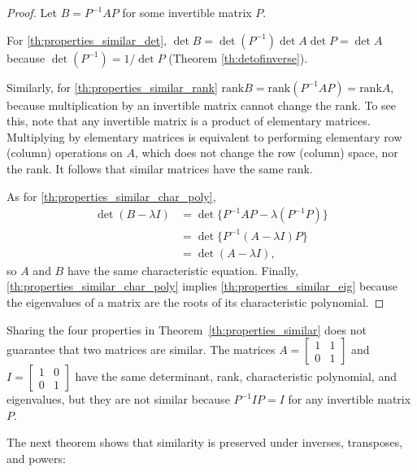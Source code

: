 \documentclass{ximera}
\begin{document}
\begin{proof}
Let $B = P^{-1}AP$ for some invertible matrix $P$. 

For \ref{th:properties_similar_det}, $\det B = \det(P^{-1}) \det A \det P = \det A$ because $\det(P^{-1}) = 1/ \det P$ (Theorem \ref{th:detofinverse}). %

Similarly, for \ref{th:properties_similar_rank} $\mbox{rank} B = \mbox{rank}(P^{-1}AP) = \mbox{rank} A$, because multiplication by an invertible matrix cannot change the rank.  To see this, note that any invertible matrix is a product of elementary matrices.  Multiplying by elementary matrices is equivalent to performing elementary row (column) operations on $A$, which does not change the row (column) space, nor the rank.  It follows that similar matrices have the same rank. 

As for \ref{th:properties_similar_char_poly},
\begin{align*}
\det(B-\lambda I) &= \det \{P^{-1}AP-\lambda(P^{-1}P)\} \\
&= \det \{ P^{-1}(A-\lambda I)P\} \\
&= \det (A-\lambda I),
\end{align*} so $A$ and $B$ have the same characteristic equation.
Finally, \ref{th:properties_similar_char_poly} implies \ref{th:properties_similar_eig} because the eigenvalues of a matrix are the roots of its characteristic polynomial.
\end{proof}

\begin{remark}\label{rem:fivePropSim}
Sharing the four properties in Theorem~\ref{th:properties_similar} does not guarantee that two matrices are similar. The matrices
$A = \begin{bmatrix}
1 & 1 \\
0 & 1
\end{bmatrix}$ and $I = \begin{bmatrix}
1 & 0 \\
0 & 1
\end{bmatrix}$ have the same determinant, rank, characteristic polynomial, and eigenvalues, but they are not similar because $P^{-1}IP = I$ for any invertible matrix $P$.
\end{remark}

The next theorem shows that similarity is preserved under inverses, transposes, and powers:
\end{document}
